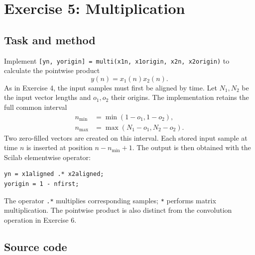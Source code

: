 \section{Exercise 5: Multiplication}
\subsection{Task and method}
Implement \texttt{[yn, yorigin] = multi(x1n, x1origin, x2n, x2origin)}
to calculate the pointwise product
\begin{equation}
  y(n)=x_1(n)x_2(n).
\end{equation}
As in Exercise 4, the input samples must first be aligned by time.
Let $N_1,N_2$ be the input vector lengths and $o_1,o_2$ their origins.
The implementation retains the full common interval
\begin{align}
  n_{\min}&=\min(1-o_1,1-o_2),\\
  n_{\max}&=\max(N_1-o_1,N_2-o_2).
\end{align}
Two zero-filled vectors are created on this interval. Each stored input
sample at time $n$ is inserted at position $n-n_{\min}+1$.
The output is then obtained with the Scilab elementwise operator:
\begin{lstlisting}[numbers=none]
yn = x1aligned .* x2aligned;
yorigin = 1 - nfirst;
\end{lstlisting}
The operator \texttt{.*} multiplies corresponding samples;
\texttt{*} performs matrix multiplication. The pointwise product is
also distinct from the convolution operation in Exercise 6.

\subsection{Source code}



